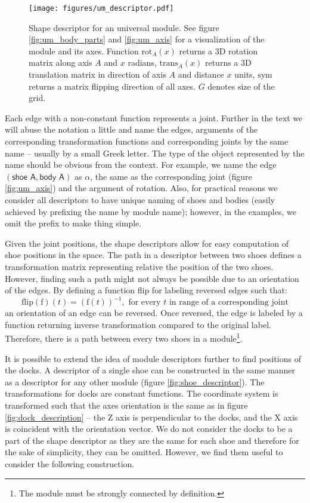 \begin{figure}[t]
    \centering
    \texttt{[image: figures/um\_descriptor.pdf]}
    \caption{Shape descriptor for an universal module. See figure
    \ref{fig:um_body_parts} and \ref{fig:um_axis} for a visualization of the
    module and its axes. Function $\text{rot}_A(x)$ returns a 3D rotation matrix
    along axis $A$ and $x$ radians, $\text{trans}_A(x)$ returns a 3D translation
    matrix in direction of axis $A$ and distance $x$ units, $\text{sym}$ returns
    a matrix flipping direction of all axes. $G$ denotes size of the grid.}
    \label{fig:um_descriptor}
\end{figure}

Each edge with a non-constant function represents a joint. Further in the text
we will abuse the notation a little and name the edges, arguments of the
corresponding transformation functions and corresponding joints by the same name
-- usually by a small Greek letter. The type of the object represented by the
name should be obvious from the context. For example, we name the edge
$(\textsf{shoe A}, \textsf{body A})$ as $\alpha$, the same as the corresponding
joint (figure \ref{fig:um_axis}) and the argument of rotation. Also, for
practical reasons we consider all descriptors to have unique naming of shoes and
bodies (easily achieved by prefixing the name by module name); however, in the
examples, we omit the prefix to make thing simple.

Given the joint positions, the shape descriptors allow for easy computation of
shoe positions in the space. The path in a descriptor between two shoes defines
a transformation matrix representing relative the position of the two shoes.
However, finding such a path might not always be possible due to an orientation
of the edges. By defining a function flip for labeling reversed edges such that:
\[\text{flip}(\text{f})(t) = (\text{f}(t))^{-1}, \text{ for every } t \text{ in
range of a corresponding joint}\] an orientation of an edge can be reversed.
Once reversed, the edge is labeled by a function returning inverse
transformation compared to the original label. Therefore, there is a path
between every two shoes in a module\footnote{The module must be strongly
connected by definition.}.

It is possible to extend the idea of module descriptors further to find
positions of the docks. A descriptor of a single shoe can be constructed in the
same manner as a descriptor for any other module (figure
\ref{fig:shoe_descriptor}). The transformations for docks are constant
functions. The coordinate system is transformed such that the axes orientation
is the same as in figure \ref{fig:dock_description} -- the Z axis is
perpendicular to the docks, and the X axis is coincident with the orientation
vector. We do not consider the docks to be a part of the shape descriptor as
they are the same for each shoe and therefore for the sake of simplicity, they
can be omitted. However, we find them useful to consider the following
construction.

